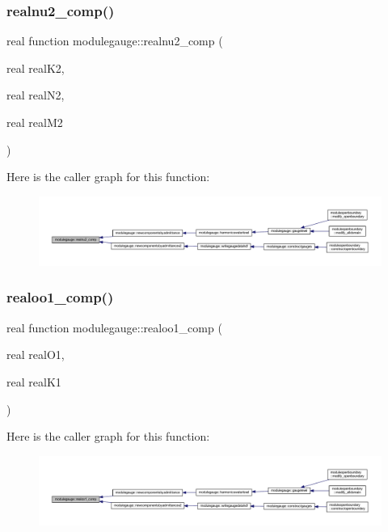 \subsubsection{\texorpdfstring{realnu2\+\_\+comp()}{realnu2\_comp()}}
{\footnotesize\ttfamily real function modulegauge\+::realnu2\+\_\+comp (\begin{DoxyParamCaption}\item[{real}]{real\+K2,  }\item[{real}]{real\+N2,  }\item[{real}]{real\+M2 }\end{DoxyParamCaption})\hspace{0.3cm}{\ttfamily [private]}}

Here is the caller graph for this function\+:\nopagebreak
\begin{figure}[H]
\begin{center}
\leavevmode
\includegraphics[width=350pt]{namespacemodulegauge_a3fe2f51cb87bda2360ce6930edea74fd_icgraph}
\end{center}
\end{figure}
\mbox{\label{namespacemodulegauge_a993e1ea45365954809031bb57945219b}} 
\subsubsection{\texorpdfstring{realoo1\+\_\+comp()}{realoo1\_comp()}}
{\footnotesize\ttfamily real function modulegauge\+::realoo1\+\_\+comp (\begin{DoxyParamCaption}\item[{real}]{real\+O1,  }\item[{real}]{real\+K1 }\end{DoxyParamCaption})\hspace{0.3cm}{\ttfamily [private]}}

Here is the caller graph for this function\+:\nopagebreak
\begin{figure}[H]
\begin{center}
\leavevmode
\includegraphics[width=350pt]{namespacemodulegauge_a993e1ea45365954809031bb57945219b_icgraph}
\end{center}
\end{figure}
\mbox{\label{namespacemodulegauge_a063b6192aa0376262853a2161d0f21da}} 
